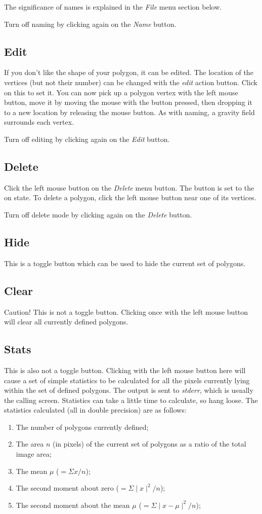 The significance of names is explained in the {\it File\/} menu section below.

Turn off naming by clicking again on the {\it Name\/} button.

\subsection{Edit}
If you don't like the shape of your polygon, it can be edited. The location of the vertices (but not their number) can be changed with the {\it edit\/} action button. Click on this to set it. You can now pick up a polygon vertex with the left mouse button, move it by moving the mouse with the button pressed, then dropping it to a new location by releasing the mouse button. As with naming, a gravity field surrounds each vertex.

Turn off editing by clicking again on the {\it Edit\/} button.

\subsection{Delete}
Click the left mouse button on the {\it Delete\/} menu button. The button is set to the on state. To delete a polygon, click the left mouse button near one of its vertices. 

Turn off delete mode  by clicking again on the {\it Delete\/} button.

\subsection{Hide}
This is a toggle button which can be used to hide the current set of polygons.

\subsection{Clear}
Caution! This is not a toggle button. Clicking once with the left mouse button will clear all currently defined polygons.

\subsection{Stats}
This is also not a toggle button. Clicking with the left mouse button here will cause a set of simple statistics to be calculated for all the pixels currently lying within the set of defined polygons. The output is sent to {\it stderr\/}, which is usually the calling screen. Statistics can take a little time to calculate, so hang loose. The statistics calculated (all in double precision) are as follows:
\begin{enumerate}
\item The number of polygons currently defined;
\item The area $n$ (in pixels) of the current set of polygons as a ratio of the total image area;
\item The mean $\mu$ ($=\Sigma x /n$);
\item The second moment about zero ($=\Sigma \mid x \mid^2/n$);
\item The second moment about the mean $\mu$ ($=\Sigma\mid x-\mu\mid^2/n$);
\end{enumerate}

